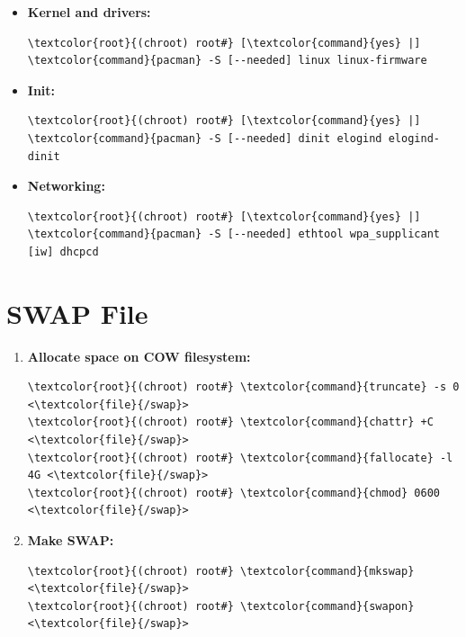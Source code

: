 \documentclass[10pt, a4paper, onecolumn, oneside, titlepage, openany]{book}
\begin{document}
\begin{itemize}
\begin{Verbatim}[commandchars=\\\{\}]
\textcolor{root}{(chroot) root#} [\textcolor{command}{yes} |] \textcolor{command}{pacman} -S [--needed] intel-ucode
\end{Verbatim}
    \item \textbf{Kernel and drivers:}
\begin{Verbatim}[commandchars=\\\{\}]
\textcolor{root}{(chroot) root#} [\textcolor{command}{yes} |] \textcolor{command}{pacman} -S [--needed] linux linux-firmware
\end{Verbatim}
    \item \textbf{Init:}
\begin{Verbatim}[commandchars=\\\{\}]
\textcolor{root}{(chroot) root#} [\textcolor{command}{yes} |] \textcolor{command}{pacman} -S [--needed] dinit elogind elogind-dinit
\end{Verbatim}
    \item \textbf{Networking:}
\begin{Verbatim}[commandchars=\\\{\}]
\textcolor{root}{(chroot) root#} [\textcolor{command}{yes} |] \textcolor{command}{pacman} -S [--needed] ethtool wpa_supplicant
[iw] dhcpcd
\end{Verbatim}
\end{itemize}

\section{SWAP File}
\begin{enumerate}
    \item \textbf{Allocate space on COW filesystem:}
\begin{Verbatim}[commandchars=\\\{\}]
\textcolor{root}{(chroot) root#} \textcolor{command}{truncate} -s 0 <\textcolor{file}{/swap}>
\textcolor{root}{(chroot) root#} \textcolor{command}{chattr} +C <\textcolor{file}{/swap}>
\textcolor{root}{(chroot) root#} \textcolor{command}{fallocate} -l 4G <\textcolor{file}{/swap}>
\textcolor{root}{(chroot) root#} \textcolor{command}{chmod} 0600 <\textcolor{file}{/swap}>
\end{Verbatim}
    \item \textbf{Make SWAP:}
\begin{Verbatim}[commandchars=\\\{\}]
\textcolor{root}{(chroot) root#} \textcolor{command}{mkswap} <\textcolor{file}{/swap}>
\textcolor{root}{(chroot) root#} \textcolor{command}{swapon} <\textcolor{file}{/swap}>
\end{Verbatim}
\end{enumerate}
\end{document}
